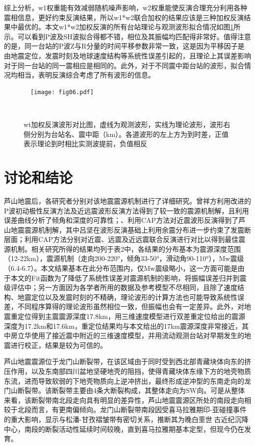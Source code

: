 综上分析，w1权重能有效减弱随机噪声影响，w2权重能使反演合理充分利用各种震相信息，更好约束反演结果，所以w1*w2联合加权的结果应该是三种加权反演结果中最优的。本文w1*w2加权反演的所有台站理论与观测波形拟合情况如图\ref{fig06}所示。可以看到P波及SH波拟合得都不错，相位及其振幅均匹配得非常好。值得注意的是，同一台站的P波Z与R分量的时间平移参数非常一致，这是因为平移因子是由地震定位，发震时刻及地球速度结构等系统性误差引起的，且理论上其误差影响对于同一台站的同一震相应是相同的。此外，对于不同震中距台站的波形，拟合情况均相当，表明反演综合考虑了所有波形的信息。
\begin{figure}
\centering
  \texttt{[image: fig06.pdf]}
  \caption{ wt加权反演波形对比图，虚线为观测波形，实线为理论波形，波形右侧分别为台站名、震中距（km）。各道波形的左上方为到时差，正值表示理论到时相比实测波提前，负值相反}
  \label{fig06}
\end{figure}

\section{讨论和结论}

芦山地震后，各研究者分别对该地震震源机制进行了详细研究。曾祥方\citep{曾祥方2013}利用\citet{Hardebeck2002}改进的P波初动极性反演方法及近远震波形反演方法得到了较一致的震源机制解，且利用误差曲线分析了倾角和深度的可靠性；\citet{刘杰2013}、\citet{吕坚2013}利用CAP方法对近震波形反演得到了芦山地震震源机制解，其中吕坚在波形反演基础上利用余震分布进一步约束了发震断层面；\citet{谢祖军2013}利用CAP方法分别对近震、远震及近远震联合反演进行对比以得到最佳震源机制。相关研究所得的结果均列于表2中，各结果的分布基本为震源深度范围（12-22km），震源机制（走向200-220°，倾角33-50°，滑动角90-110°），Mw震级（6.4-6.7）。本文结果基本在此分布范围内，仅Mw震级略小，这一方面可能是由于本文的Fit函数为了降低了系统性误差对震源机制的影响，将振幅误差归并到震级评估中；另一方面因为各学者所用的数据及参考模型不尽相同，且除了速度结构、地震定位以及发震时刻的不精确，理论波形的计算方法也可能导致系统性误差，不同程序算得的理论波形虽然相位一致，但振幅也会有一定差异\citep{Herrmann1985}。此外，\citet{高原2013}对地震重定位得到主震震源深度17.8km，\citet{房立华2013}用三维速度模型进行双差重定位给出的震源深度为17.2km和17.6km，重定位结果均与本文给出的17km震源深度非常接近，其中房立华使用了接近震中附近的三维速度模型，并用流动观测台站对早期发生的地震进行校正，结果是较为可信的。

芦山地震震源位于龙门山断裂带，在该区域由于同时受到西北部青藏块体向东的挤压作用，以及东南部四川盆地坚硬地壳的阻挡，使得青藏块体东缘下方的地壳物质东流，进而导致软弱的下地壳物质向上逆冲挤出，最终形成逆冲型的东南走向的龙门山断裂带\citep{Zhang2013}。该断裂带主要由4条大断裂构成\citep{邓起东1994,李智武2008}，其整体走向为SW向。可是从整体来看，该断裂带南北段走向具有明显的差异性\citep{郭正吾1996,Jia2006,Arne1997,邓康龄2007}，芦山地震震源区所处的南段走向相较于北段而言，有更南偏倾向。龙门山断裂带南段因受喜马拉雅期印-亚碰撞事件的重大影响，显示与松潘-甘孜褶皱带有密切关系，推断其为晚白垩世古近纪沉降中心，南段的断裂活动性延续时间较晚，直到喜马拉雅期基本定型，但现今仍在发育\citep{李智武2008}。

